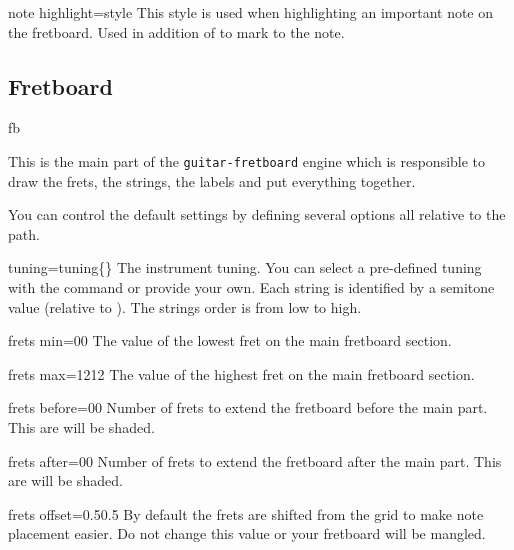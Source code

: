 \documentclass[a4paper]{article}
\newcommand{\pkg}[1]{\texttt{#1}}
\begin{document}
\begin{docKey}[tikz][]{note highlight}{=style}{}
  This style is used when highlighting an important note on the
  fretboard. Used in addition of  to mark to
  the note.
\end{docKey}


\subsection{Fretboard}

\begin{docEnvironment}{fb}{}

  This is the main part of the \pkg{guitar-fretboard} engine which is
  responsible to draw the frets, the strings, the labels and put everything
  together.

  You can control the default settings by defining several options all
  relative to the  path.

  \begin{docKey}[fb][]{tuning}{=tuning}{\{\}}
    The instrument tuning. You can select a pre-defined tuning with the
     command or provide your own. Each string is identified by
    a semitone value (relative to \pC). The strings order is from low to
    high.
  \end{docKey}

  \begin{docKey}[fb][]{frets min}{=0}{0}
    The value of the lowest fret on the main fretboard section.
  \end{docKey}

  \begin{docKey}[fb][]{frets max}{=12}{12}
    The value of the highest fret on the main fretboard section.
  \end{docKey}

  \begin{docKey}[fb][]{frets before}{=0}{0}
    Number of frets to extend the fretboard before the main part. This are
    will be shaded.
  \end{docKey}

  \begin{docKey}[fb][]{frets after}{=0}{0}
    Number of frets to extend the fretboard after the main part. This are
    will be shaded.
  \end{docKey}

  \begin{docKey}[fb][]{frets offset}{=0.5}{0.5}
    By default the frets are shifted from the grid to make note placement
    easier. Do not change this value or your fretboard will be mangled.
  \end{docKey}


\end{docEnvironment}
\end{document}

